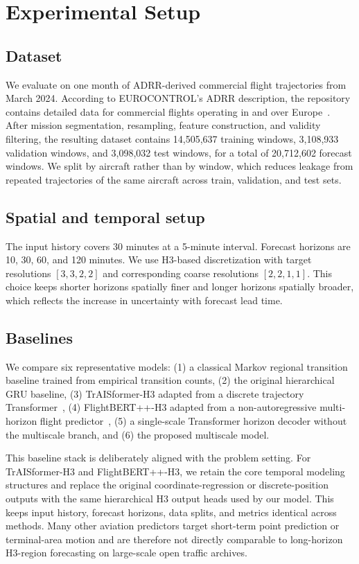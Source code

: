 \section{Experimental Setup}

\subsection{Dataset}

We evaluate on one month of ADRR-derived commercial flight trajectories from March 2024. According to EUROCONTROL's ADRR description, the repository contains detailed data for commercial flights operating in and over Europe~\cite{eurocontrol_adrr_2025}. After mission segmentation, resampling, feature construction, and validity filtering, the resulting dataset contains 14,505,637 training windows, 3,108,933 validation windows, and 3,098,032 test windows, for a total of 20,712,602 forecast windows. We split by aircraft rather than by window, which reduces leakage from repeated trajectories of the same aircraft across train, validation, and test sets.

\subsection{Spatial and temporal setup}

The input history covers 30 minutes at a 5-minute interval. Forecast horizons are 10, 30, 60, and 120 minutes. We use H3-based discretization with target resolutions $[3,3,2,2]$ and corresponding coarse resolutions $[2,2,1,1]$. This choice keeps shorter horizons spatially finer and longer horizons spatially broader, which reflects the increase in uncertainty with forecast lead time.

\subsection{Baselines}

We compare six representative models: (1) a classical Markov regional transition baseline trained from empirical transition counts, (2) the original hierarchical GRU baseline, (3) TrAISformer-H3 adapted from a discrete trajectory Transformer~\cite{nguyen_traisformer_2021}, (4) FlightBERT++-H3 adapted from a non-autoregressive multi-horizon flight predictor~\cite{guo_flightbertpp_2024}, (5) a single-scale Transformer horizon decoder without the multiscale branch, and (6) the proposed multiscale model.

This baseline stack is deliberately aligned with the problem setting. For TrAISformer-H3 and FlightBERT++-H3, we retain the core temporal modeling structures and replace the original coordinate-regression or discrete-position outputs with the same hierarchical H3 output heads used by our model. This keeps input history, forecast horizons, data splits, and metrics identical across methods. Many other aviation predictors target short-term point prediction or terminal-area motion and are therefore not directly comparable to long-horizon H3-region forecasting on large-scale open traffic archives.


